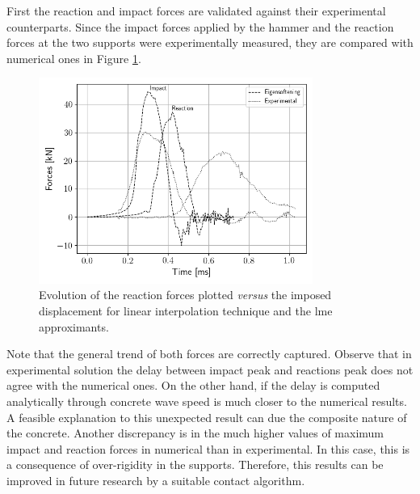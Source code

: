 \message{ !name(2020_EFM_MPM_Eigensoftening.tex)}\documentclass[preprint,12pt,a4paper]{elsarticle}
\begin{document}
First the reaction and impact forces are validated against their
experimental counterparts. Since the impact forces applied by the
hammer and the reaction forces at the two supports were experimentally
measured, they are compared with numerical ones in Figure
\ref{fig:Reactions-Forces-impact-test}. 
\begin{figure}
  \centering
  \includegraphics[width=0.8\textwidth]{Figure-impact-test-Forces-Time}
  \caption{Evolution of the reaction forces plotted \textit{versus}
    the imposed displacement for linear interpolation technique and
    the \acrshort{lme} approximants.}
  \label{fig:Reactions-Forces-impact-test}
\end{figure}
Note that the general trend of both forces are correctly
captured. Observe that in experimental solution the delay between
impact peak and reactions peak does not agree with the numerical
ones. On the other hand, if the delay is computed analytically through
concrete wave speed is much closer to the numerical results. A
feasible explanation to this unexpected result can due the composite
nature of the concrete. Another discrepancy is in the much higher
values of maximum impact and reaction forces in numerical than in
experimental. In this case, this is a consequence of over-rigidity
in the supports. Therefore, this results can be improved in future research
by a suitable contact algorithm.\\
\end{document}
